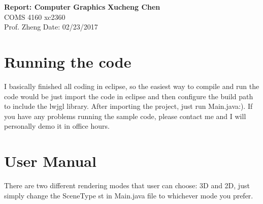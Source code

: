 \documentclass[a4paper, 11pt]{article}
\begin{document}
\noindent
\large\textbf{Report: Computer Graphics} \hfill \textbf{Xucheng Chen} \\
\normalsize COMS 4160 \hfill xc2360 \\
Prof. Zheng \hfill Date: 02/23/2017

\section*{Running the code}
    \indent I basically finished all coding in eclipse, so the easiest way to compile and run the code would be just import the code in eclipse and then configure the build path to include the lwjgl library. After importing the project, just run Main.java:). If you have any  problems running the sample code, please contact me and I will personally demo it in office hours.

\section*{User Manual}
    There are two different rendering modes that user can choose: 3D and 2D, just simply change the SceneType st in Main.java file to whichever mode you prefer.
\end{document}
